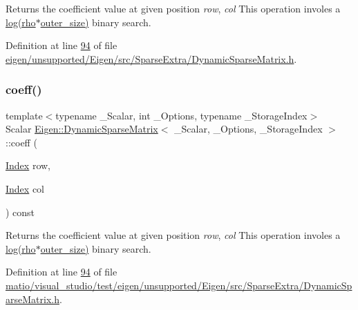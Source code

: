 \begin{DoxyReturn}{Returns}
the coefficient value at given position {\itshape row}, {\itshape col} This operation involes a \hyperlink{structlog}{log(rho$\ast$outer\+\_\+size)} binary search. 
\end{DoxyReturn}


Definition at line \hyperlink{eigen_2unsupported_2_eigen_2src_2_sparse_extra_2_dynamic_sparse_matrix_8h_source_l00094}{94} of file \hyperlink{eigen_2unsupported_2_eigen_2src_2_sparse_extra_2_dynamic_sparse_matrix_8h_source}{eigen/unsupported/\+Eigen/src/\+Sparse\+Extra/\+Dynamic\+Sparse\+Matrix.\+h}.

\mbox{\label{class_eigen_1_1_dynamic_sparse_matrix_a64b7d586c6b212dbe912a9ee05c3a85a}} 
\subsubsection{\texorpdfstring{coeff()}{coeff()}\hspace{0.1cm}{\footnotesize\ttfamily [2/2]}}
{\footnotesize\ttfamily template$<$typename \+\_\+\+Scalar, int \+\_\+\+Options, typename \+\_\+\+Storage\+Index$>$ \\
Scalar \hyperlink{class_eigen_1_1_dynamic_sparse_matrix}{Eigen\+::\+Dynamic\+Sparse\+Matrix}$<$ \+\_\+\+Scalar, \+\_\+\+Options, \+\_\+\+Storage\+Index $>$\+::coeff (\begin{DoxyParamCaption}\item[{\hyperlink{group___core___module_a554f30542cc2316add4b1ea0a492ff02}{Index}}]{row,  }\item[{\hyperlink{group___core___module_a554f30542cc2316add4b1ea0a492ff02}{Index}}]{col }\end{DoxyParamCaption}) const\hspace{0.3cm}{\ttfamily [inline]}}

\begin{DoxyReturn}{Returns}
the coefficient value at given position {\itshape row}, {\itshape col} This operation involes a \hyperlink{structlog}{log(rho$\ast$outer\+\_\+size)} binary search. 
\end{DoxyReturn}


Definition at line \hyperlink{matio_2visual__studio_2test_2eigen_2unsupported_2_eigen_2src_2_sparse_extra_2_dynamic_sparse_matrix_8h_source_l00094}{94} of file \hyperlink{matio_2visual__studio_2test_2eigen_2unsupported_2_eigen_2src_2_sparse_extra_2_dynamic_sparse_matrix_8h_source}{matio/visual\+\_\+studio/test/eigen/unsupported/\+Eigen/src/\+Sparse\+Extra/\+Dynamic\+Sparse\+Matrix.\+h}.

